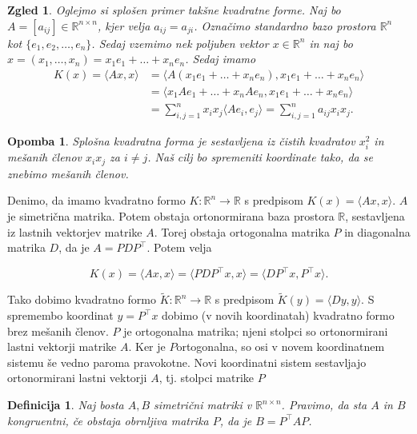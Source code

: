 \documentclass[10pt, a4paper]{article}
\newtheorem{defi}{Definicija}[section]
\newenvironment{noticeB}{%
  \tcolorbox[%
  notitle,
  empty,
  enhanced,  %
  breakable,
  coltext=black,
  colback=white, 
  fontupper=\rmfamily,
  parbox=false,
  noparskip,
  sharp corners,
  boxrule=-1pt,  %
  frame hidden,
  left=7pt,  %
  right=7pt,
  top=5pt,
  bottom=5pt,
  before skip=2.5ex plus 2pt,
  after skip=2.5ex plus 2pt,
  borderline west = {1.5pt}{-0.1pt}{blue!30!black}, %
  overlay unbroken and last={%
    \draw[color=black, line width=1.25pt]
    ($(frame.south west)+(1.pt, -0.1pt)$) -- ++(2em, 0);
  }
  ]}
{\endtcolorbox}
\newenvironment{definicija}{\begin{defi}\begin{noticeB}}{%
    \end{noticeB}\end{defi}}
\newtheorem*{opomba}{Opomba}
\newtheorem{zgled}{Zgled}[section]
\newcommand{\R}{\mathbb {R}}
\newcommand{\sprod}[2]{\langle {#1},{#2} \rangle}
\begin{document}
\begin{zgled}
    Oglejmo si splošen primer takšne kvadratne forme.
    Naj bo $A = [a_{ij}] \in \R^{n \times n}$, kjer velja $a_{ij} = a_{ji}$.
    Označimo standardno bazo prostora $\R^n$ kot $\{e_1, e_2, \dots, e_n\}$.
    Sedaj vzemimo nek poljuben vektor $x \in \R^n$ in naj bo $x = (x_1, \dots, x_n) = x_1 e_1 + \dots + x_n e_n$.
    Sedaj imamo 
    \begin{align*}
        K(x) = \sprod{Ax}{x} &= \sprod{A(x_1 e_1 + \dots + x_n e_n)}{x_1 e_1 + \dots + x_n e_n}\\
        &= \sprod{x_1 A e_1 + \dots + x_n A e_n}{x_1 e_1 + \dots + x_n e_n}\\
        &= \sum_{i, j = 1} ^n x_i x_j \sprod{A e_i}{e_j} = \sum_{i, j = 1} ^n a_{ij} x_i x_j.
    \end{align*}
\end{zgled}

\begin{opomba}
    Splošna kvadratna forma je sestavljena iz čistih kvadratov $x_i^2$ in mešanih členov $x_i x_j$ za $i \neq j$.
    Naš cilj bo spremeniti koordinate tako, da se znebimo mešanih členov.
\end{opomba}

Denimo, da imamo kvadratno formo $K: \R^n \to \R$ s predpisom $K(x) = \sprod{Ax}{x}$.
$A$ je simetrična matrika. Potem obstaja ortonormirana baza prostora $\R$, sestavljena iz
lastnih vektorjev matrike $A$. Torej obstaja ortogonalna matrika $P$ in diagonalna matrika $D$,
da je $A = PDP^\top$. Potem velja 

\begin{equation*}
    K(x) = \sprod{Ax}{x} = \sprod{PDP^\top x}{x} = \sprod{DP^\top x}{P^\top x}.
\end{equation*}

Tako dobimo kvadratno formo $\widetilde{K}: \R^n \to \R$ s predpisom $\widetilde{K}(y) = \sprod{Dy}{y}$.
S spremembo koordinat $y = P^\top x$ dobimo (v novih koordinatah) kvadratno formo brez mešanih členov.
$P$ je ortogonalna matrika; njeni stolpci so ortonormirani lastni vektorji matrike $A$.
Ker je $P$ortogonalna, so osi v novem koordinatnem sistemu še vedno paroma pravokotne.
Novi koordinatni sistem sestavljajo ortonormirani lastni vektorji $A$, tj. stolpci matrike $P$

\begin{definicija}
    Naj bosta $A, B$ simetrični matriki v $\R^{n \times n}$.
    Pravimo, da sta $A$ in $B$ kongruentni, če obstaja obrnljiva matrika $P$,
    da je $B = P^\top A P$. 
\end{definicija}
\end{document}
